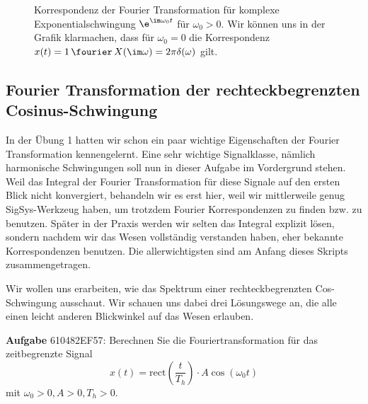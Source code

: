 \begin{figure}[h!]
\centering
%
%
%
%
\caption{Korrespondenz der Fourier Transformation für komplexe Exponentialschwingung
$\e^{\im\omega_0 t}$ für $\omega_0>0$.
Wir können uns in der Grafik klarmachen, dass für $\omega_0=0$ die Korrespondenz
$x(t)=1 \, \fourier \, X(\im\omega)=2\pi\delta(\omega)$ gilt.}
\label{fig:ue4_exp_ft}
\end{figure}





\newpage
\subsection{Fourier Transformation der rechteckbegrenzten Cosinus-Schwingung}
\label{sec:610482EF57}
\begin{Ziel}
In der Übung 1 hatten wir schon ein paar wichtige Eigenschaften der Fourier Transformation
kennengelernt. Eine sehr wichtige Signalklasse, nämlich harmonische
Schwingungen soll nun in dieser Aufgabe im Vordergrund stehen.
%
Weil das Integral der Fourier Transformation für diese Signale auf den ersten
Blick nicht konvergiert, behandeln wir es erst hier, weil wir mittlerweile genug
SigSys-Werkzeug haben, um trotzdem Fourier Korrespondenzen zu finden bzw. zu
benutzen.
%
Später in der Praxis werden wir selten das Integral explizit lösen, sondern
nachdem wir das Wesen vollständig verstanden haben, eher bekannte Korrespondenzen
benutzen. Die allerwichtigsten sind am Anfang dieses Skripts zusammengetragen.

Wir wollen uns erarbeiten, wie das Spektrum einer rechteckbegrenzten Cos-Schwingung
ausschaut. Wir schauen uns dabei drei Lösungswege an, die alle einen leicht anderen
Blickwinkel auf das Wesen erlauben.
\end{Ziel}
\textbf{Aufgabe} {\tiny 610482EF57}: Berechnen Sie die Fouriertransformation für
das zeitbegrenzte Signal
\begin{equation}
x(t) = \mathrm{rect}(\frac{t}{T_h}) \cdot A \cos(\omega_0 t)
\end{equation}
mit $\omega_0>0, A>0, T_h>0$.

